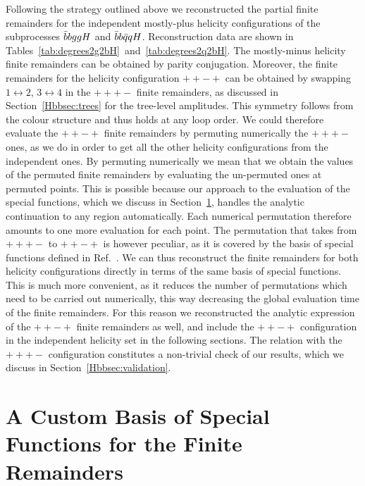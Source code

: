 \documentclass[main.tex]{subfiles}
\begin{document}
Following the strategy outlined above we reconstructed the partial finite remainders for the independent mostly-plus helicity configurations of the subprocesses $\bar{b}bggH$ and $\bar{b}b\bar{q}qH$. Reconstruction data are shown in Tables~\ref{tab:degrees2g2bH}~and~\ref{tab:degrees2q2bH}. The mostly-minus helicity finite remainders can be obtained by parity conjugation. Moreover, the finite remainders for the helicity configuration $++-+$ can be obtained by swapping $1\leftrightarrow2$, $3\leftrightarrow 4$ in the $+++-$ finite remainders, as discussed in Section~\ref{Hbbsec:trees} for the tree-level amplitudes. 
This symmetry follows from the colour structure and thus holds at any loop order. 
We could therefore evaluate the $++-+$ finite remainders by permuting numerically the $+++-$ ones, as we do in order to get all the other helicity configurations from the independent ones. By permuting numerically we mean that we obtain the values of the permuted finite remainders by evaluating the un-permuted ones at permuted points. This is possible because our approach to the evaluation of the special functions, which we discuss in Section~\ref{Hbbsec:Hbasis}, handles the analytic continuation to any region automatically. Each numerical permutation therefore amounts to one more evaluation for each point. The permutation that takes from $+++-$ to $++-+$ is however peculiar, as it is covered by the basis of special functions defined in Ref.~\cite{Badger:2021nhg}. We can thus reconstruct the finite remainders for both helicity configurations directly in terms of the same basis of special functions. This is much more convenient, as it reduces the number of permutations which need to be carried out numerically, this way decreasing the global evaluation time of the finite remainders. For this reason we reconstructed the analytic expression of the $++-+$ finite remainders as well, and include the $++-+$ configuration in the independent helicity set in the following sections. 
The relation with the $+++-$ configuration constitutes a non-trivial check of our results, which we discuss in Section~\ref{Hbbsec:validation}.


\section{A Custom Basis of Special Functions for the Finite Remainders}
\label{Hbbsec:Hbasis}
\end{document}
